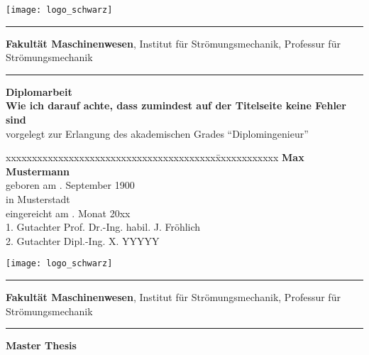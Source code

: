 \begin{titlepage}
\addtolength{\topmargin}{-1.5cm}
\hspace{-2.1cm} \texttt{[image: logo\_schwarz]}
\vspace{0.5cm}
\hrule 
\vspace{0.05cm}
\small\textbf{Fakult\"at Maschinenwesen},
Institut f\"ur Str\"omungsmechanik,
Professur f\"ur Str\"omungsmechanik
\vspace{0.1cm}
\hrule 
\vspace{4cm}
\textbf{\Large Diplomarbeit}\\

\vspace{1.5cm}
%
\textbf{\LARGE Wie ich darauf achte, dass zumindest auf der Titelseite keine Fehler sind}\\[2.0cm]
%
\normalsize
vorgelegt zur Erlangung des akademischen Grades "`Diplomingenieur"'\\[2.5cm]
\normalsize
\begin{tabbing}
xxxxxxxxxxxxxxxxxxxxxxxxxxxxxxxxxxxxxxxx\=xxxxxxxxxxxx\kill
        							\>	\textbf{Max Mustermann}									\\
geboren am						. September 1900											\\
in										\>	Musterstadt															\\[0.1cm]
eingereicht am				. Monat 20xx													\\[0.5cm]
1. Gutachter					\>  Prof. Dr.-Ing. habil. J. Fr\"ohlich			\\
2. Gutachter					\>	Dipl.-Ing. X. YYYYY											\\
\end{tabbing}
\cleardoublepage

\hspace{-2.1cm} 
\texttt{[image: logo\_schwarz]}
\vspace{0.5cm}
\hrule 
\vspace{0.05cm}
\small\textbf{Fakult\"at Maschinenwesen},
Institut f\"ur Str\"omungsmechanik,
Professur f\"ur Str\"omungsmechanik
\vspace{0.1cm}
\hrule 
\vspace{4cm}
\textbf{\Large Master Thesis}\\


\end{titlepage}
